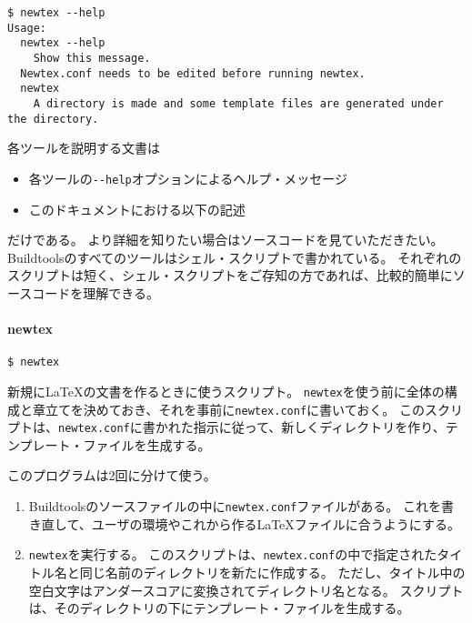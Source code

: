 \begin{verbatim}
$ newtex --help
Usage:
  newtex --help
    Show this message.
  Newtex.conf needs to be edited before running newtex.
  newtex
    A directory is made and some template files are generated under the directory.
\end{verbatim}

各ツールを説明する文書は

\begin{itemize}
\tightlist
\item
  各ツールの\texttt{-\/-help}オプションによるヘルプ・メッセージ
\item
  このドキュメントにおける以下の記述
\end{itemize}

だけである。 より詳細を知りたい場合はソースコードを見ていただきたい。
Buildtoolsのすべてのツールはシェル・スクリプトで書かれている。
それぞれのスクリプトは短く、シェル・スクリプトをご存知の方であれば、比較的簡単にソースコードを理解できる。

\hypertarget{newtex}{%
\paragraph{newtex}\label{newtex}}

\begin{verbatim}
$ newtex
\end{verbatim}

新規にLaTeXの文書を作るときに使うスクリプト。
\texttt{newtex}を使う前に全体の構成と章立てを決めておき、それを事前に\texttt{newtex.conf}に書いておく。
このスクリプトは、\texttt{newtex.conf}に書かれた指示に従って、新しくディレクトリを作り、テンプレート・ファイルを生成する。

このプログラムは2回に分けて使う。

\begin{enumerate}
\def\labelenumi{\arabic{enumi}.}
\tightlist
\item
  Buildtoolsのソースファイルの中に\texttt{newtex.conf}ファイルがある。
  これを書き直して、ユーザの環境やこれから作るLaTeXファイルに合うようにする。
\item
  \texttt{newtex}を実行する。
  このスクリプトは、\texttt{newtex.conf}の中で指定されたタイトル名と同じ名前のディレクトリを新たに作成する。
  ただし、タイトル中の空白文字はアンダースコアに変換されてディレクトリ名となる。
  スクリプトは、そのディレクトリの下にテンプレート・ファイルを生成する。
\end{enumerate}

